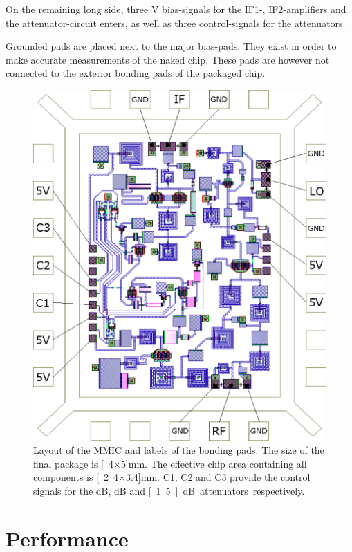 		On the remaining long side, three \unit[5]{V} bias-signals for the IF1-, IF2-amplifiers and the attenuator-circuit enters, as well as three control-signals for the attenuators.

		Grounded pads are placed next to the major bias-pads. They exist in order to make accurate measurements of the naked chip. These pads are however not connected to the exterior bonding pads of the packaged chip.

		\begin{figure}[hbt!]
			\centering
			\includegraphics[width=1.0\textwidth]{fig/summary/package}
			\caption[Layout of the pad-structure.]{Layout of the MMIC and labels of the bonding pads. The size of the final package is \unit[4$\times$5]{mm}. The effective chip area containing all components is \unit[2.4$\times$3.4]{mm}. C1, C2 and C3 provide the control signals for the \unit[6]{dB}, \unit[3]{dB} and \unit[1.5]{dB} attenuators respectively.}\label{fig:final_chip}
		\end{figure}

	\section{Performance}
